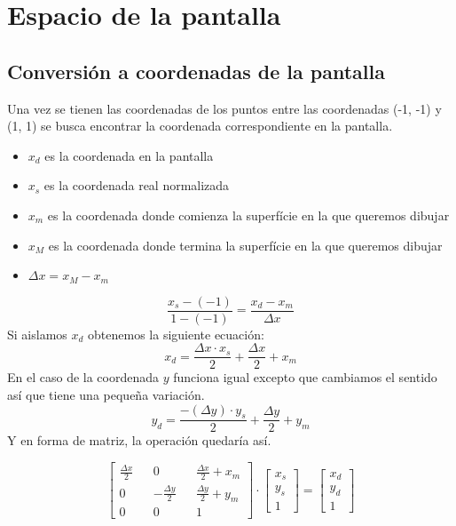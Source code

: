 \chapter{Espacio de la pantalla}
\section{Conversión a coordenadas de la pantalla}
Una vez se tienen las coordenadas de los puntos entre las coordenadas (-1, -1) y (1, 1) se busca encontrar la coordenada correspondiente en la pantalla.
\begin{itemize}
  \item{\(x_d\) es la coordenada en la pantalla}
  \item{\(x_s\) es la coordenada real normalizada}  
  \item{\(x_m\) es la coordenada donde comienza la superfície en la que queremos dibujar}
  \item{\(x_M\) es la coordenada donde termina la superfície en la que queremos dibujar}  
  \item{\(\Delta x = x_M - x_m\)}
\end{itemize}
\begin{equation}
  \frac{x_s-(-1)}{1-(-1)} = \frac{x_d - x_m}{\Delta x}
\end{equation}
Si aislamos \(x_d\) obtenemos la siguiente ecuación:
\begin{equation}
  x_d = \frac{\Delta x \cdot x_s}{2}+\frac{\Delta x}{2}+x_m
\end{equation}
En el caso de la coordenada \(y\) funciona igual excepto que cambiamos el sentido así que tiene una pequeña variación.
\begin{equation}
  y_d = \frac{-(\Delta y) \cdot y_s}{2}+\frac{\Delta y}{2}+y_m
\end{equation}
Y en forma de matriz, la operación quedaría así.

\begin{equation}
  \begin{bmatrix}
     \frac{\Delta x}{2} && 0 && \frac{\Delta x}{2} + x_m\\
     0 && - \frac{\Delta y}{2} && \frac{\Delta y}{2} + y_m \\
     0 && 0 && 1
  \end{bmatrix}
  \cdot
  \begin{bmatrix}
    x_s\\
    y_s\\
    1
  \end{bmatrix}
  =
  \begin{bmatrix}
    x_d\\
    y_d\\
    1
  \end{bmatrix}
\end{equation}
